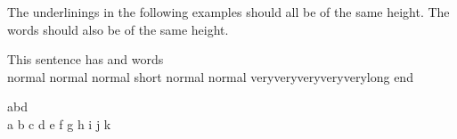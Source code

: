 The underlinings in the following examples should all be of the same height. The words should also be of the same height.

\ea
\gll This sentence has   and  words\\
 normal normal normal short                     normal normal veryveryveryveryverylong end\\
\z

\ea
\gll {}             abd\\
a b c d e  f g h i j k\\
\z